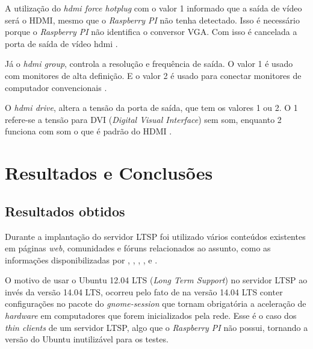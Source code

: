\documentclass[
	12pt,				%
	openright,			%
	twoside,			%
	a4paper,			%
	chapter=TITLE,		%
	english,			%
	brazil				%
	]{abntex2}
\begin{document}
A utilização do \textit{hdmi force hotplug} com o valor 1 informado que a saída de vídeo será o HDMI, mesmo que o \textit{Raspberry PI} não tenha detectado. Isso é necessário porque o \textit{Raspberry PI} não identifica o conversor VGA. Com isso é cancelada a porta de saída de vídeo hdmi \cite{vga}.  

Já o \textit{hdmi group}, controla a resolução e frequência de saída. O valor 1 é usado com monitores de alta definição. E o valor 2 é usado para  conectar monitores de computador convencionais \cite{vga}. 

O \textit{hdmi drive}, altera a tensão da porta de saída, que tem os valores 1 ou 2. O 1 refere-se a tensão para DVI (\textit{Digital Visual Interface}) sem som, enquanto 2 funciona com som o que é padrão do HDMI \cite{vga}. 






\chapter{Resultados e Conclusões}

\section{Resultados obtidos}
\label{result}

Durante a implantação do servidor LTSP foi utilizado vários conteúdos existentes em páginas \textit{web}, comunidades e fóruns relacionados ao assunto, como as informações disponibilizadas por , , , ,  e .

O motivo de usar o Ubuntu 12.04 LTS (\textit{Long Term Support}) no servidor LTSP ao invés da versão 14.04 LTS, ocorreu pelo fato de na versão 14.04 LTS conter configurações no pacote do \textit{gnome-session} que tornam obrigatória a aceleração de \textit{hardware} em computadores que forem inicializados pela rede. Esse é o caso dos \textit{thin clients} de um servidor LTSP, algo que o \textit{Raspberry PI} não possui, tornando a versão do Ubuntu inutilizável para os testes.
\end{document}
